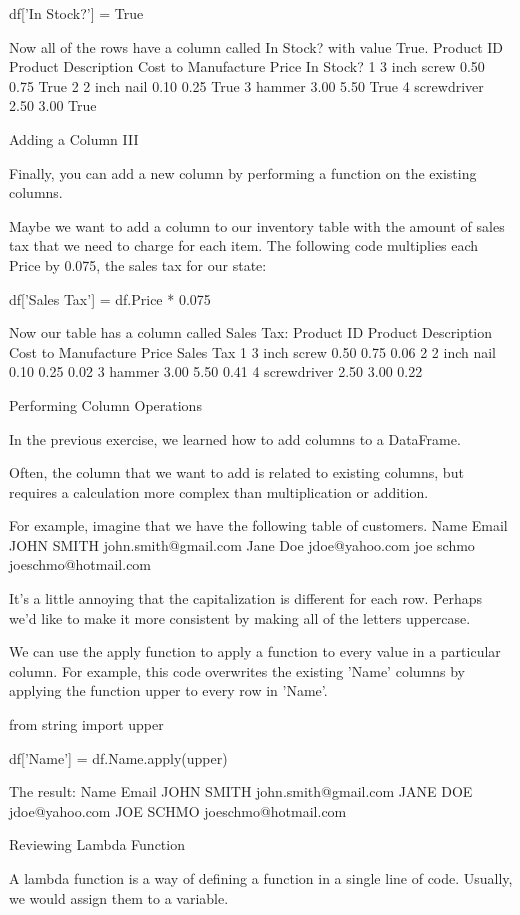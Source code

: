 \documentclass{journal}
\begin{document}
df['In Stock?'] = True

Now all of the rows have a column called In Stock? with value True.
Product ID 	Product Description 	Cost to Manufacture 	Price 	In Stock?
1 	3 inch screw 	0.50 	0.75 	True
2 	2 inch nail 	0.10 	0.25 	True
3 	hammer 	3.00 	5.50 	True
4 	screwdriver 	2.50 	3.00 	True



Adding a Column III

Finally, you can add a new column by performing a function on the existing columns.

Maybe we want to add a column to our inventory table with the amount of sales tax that we need to charge for each item. The following code multiplies each Price by 0.075, the sales tax for our state:

df['Sales Tax'] = df.Price * 0.075

Now our table has a column called Sales Tax:
Product ID 	Product Description 	Cost to Manufacture 	Price 	Sales Tax
1 	3 inch screw 	0.50 	0.75 	0.06
2 	2 inch nail 	0.10 	0.25 	0.02
3 	hammer 	3.00 	5.50 	0.41
4 	screwdriver 	2.50 	3.00 	0.22


Performing Column Operations

In the previous exercise, we learned how to add columns to a DataFrame.

Often, the column that we want to add is related to existing columns, but requires a calculation more complex than multiplication or addition.

For example, imagine that we have the following table of customers.
Name 	Email
JOHN SMITH 	john.smith@gmail.com
Jane Doe 	jdoe@yahoo.com
joe schmo 	joeschmo@hotmail.com

It’s a little annoying that the capitalization is different for each row. Perhaps we’d like to make it more consistent by making all of the letters uppercase.

We can use the apply function to apply a function to every value in a particular column. For example, this code overwrites the existing 'Name' columns by applying the function upper to every row in 'Name'.

from string import upper

df['Name'] = df.Name.apply(upper)

The result:
Name 	Email
JOHN SMITH 	john.smith@gmail.com
JANE DOE 	jdoe@yahoo.com
JOE SCHMO 	joeschmo@hotmail.com


Reviewing Lambda Function

A lambda function is a way of defining a function in a single line of code. Usually, we would assign them to a variable.
\end{document}
